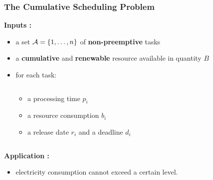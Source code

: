 \begin{frame}
  \frametitle{The Cumulative Scheduling Problem} 
  \vspace{0.1cm}
  \textbf{Inputs : }
  \vspace{0.15cm}
  \begin{itemize}
  \item a set ${\cal A}=\{1,\dots ,n\}$ of {\bf non-preemptive} tasks
    \vspace{0.15cm}
  \item a {\bf cumulative} and {\bf renewable} resource available in quantity $B$
    \vspace{0.15cm}
  \item for each task:
    \vspace{-1cm}
    \begin{columns}
      \hfill
      \begin{column}{0.36\linewidth}
        \begin{itemize}
        \item \footnotesize  a processing time $p_i$
        \item \footnotesize a resource consumption $b_i$ 
        \item \footnotesize a release date $r_i$ and a deadline $d_i$ 
        \end{itemize}
      \end{column}
      \begin{column}{0.7\linewidth}
        \centering
        
      \end{column} 
    \end{columns}
  \end{itemize}
  \vspace{-0.5cm}
  \textbf{Application : }
  \vfill
  \begin{itemize}
  \item electricity consumption cannot exceed a certain level.
  \end{itemize}
\end{frame}

